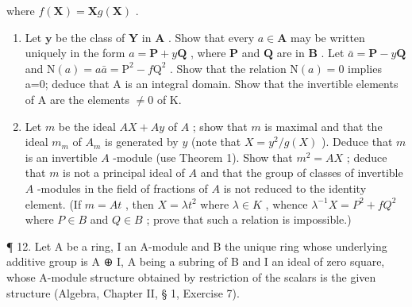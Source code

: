where \(f(\mathbf{X}) = \mathbf{X}g(\mathbf{X})\) .

\begin{enumerate}
\def\labelenumi{(\alph{enumi})}
\item
  Let \(\pmb{y}\) be the class of \(\mathbf{Y}\) in \(\mathbf{A}\) . Show that every \(a \in \mathbf{A}\) may be written uniquely in the form \(a = \mathbf{P} + y\mathbf{Q}\) , where \(\mathbf{P}\) and \(\mathbf{Q}\) are in \(\mathbf{B}\) . Let \(\bar{a} = \mathbf{P} - y\mathbf{Q}\) and \(\mathrm{N}(a)=a\bar{a}=\mathrm{P}^{2}-f\mathrm{Q}^{2}\) . Show that the relation \(\mathrm{N}(a)=0\) implies a=0; deduce that A is an integral domain. Show that the invertible elements of A are the elements \(\neq0\) of K.
\item
  Let \(m\) be the ideal \(AX + Ay\) of \(A\) ; show that \(m\) is maximal and that the ideal \(m_m\) of \(A_m\) is generated by \(y\) (note that \(X = y^2 / g(X)\) ). Deduce that \(m\) is an invertible \(A\) -module (use Theorem 1). Show that \(m^2 = AX\) ; deduce that \(m\) is not a principal ideal of \(A\) and that the group of classes of invertible \(A\) -modules in the field of fractions of \(A\) is not reduced to the identity element. (If \(m = At\) , then \(X = \lambda t^2\) where \(\lambda \in K\) , whence \(\lambda^{-1}X = P^2 + fQ^2\) where \(P \in B\) and \(Q \in B\) ; prove that such a relation is impossible.)
\end{enumerate}

¶ 12. Let A be a ring, I an A-module and B the unique ring whose underlying additive group is A ⊕ I, A being a subring of B and I an ideal of zero square, whose A-module structure obtained by restriction of the scalars is the given structure (Algebra, Chapter II, § 1, Exercise 7).

